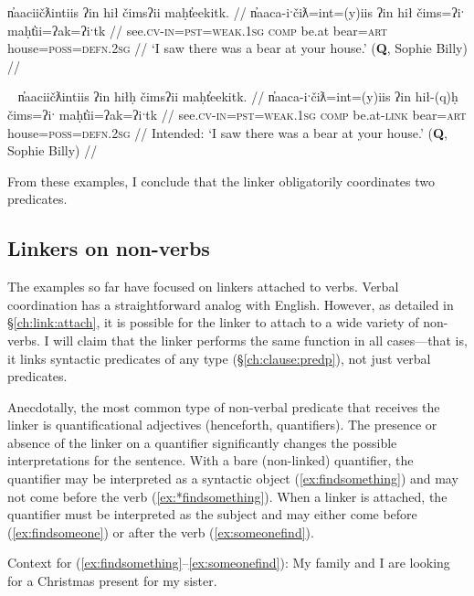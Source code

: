 \ex \label{ex:sawabear}
\begingl
\glpreamble n̓aaciičƛintiis ʔin hił čimsʔii maḥt̓eekitk. //
\gla n̓aaca-iˑčiƛ=int=(y)iis ʔin hił čims=ʔiˑ maḥt̓ii=ʔak=ʔiˑtk //
\glb see.\textsc{cv}-\textsc{in}=\textsc{pst}=\textsc{weak.1sg} \textsc{comp} be.at bear=\textsc{art} house=\textsc{poss}=\textsc{defn.2sg} //
\glft `I saw there was a bear at your house.' (\textbf{Q}, Sophie Billy) //
\endgl
\xe

\ex~ \label{*ex:sawabear}
\begingl
\glpreamble *n̓aaciičƛintiis ʔin hiłḥ čimsʔii maḥt̓eekitk. //
\gla n̓aaca-iˑčiƛ=int=(y)iis ʔin hił-(q)ḥ čims=ʔiˑ maḥt̓ii=ʔak=ʔiˑtk //
\glb see.\textsc{cv}-\textsc{in}=\textsc{pst}=\textsc{weak.1sg} \textsc{comp} be.at-\textsc{link} bear=\textsc{art} house=\textsc{poss}=\textsc{defn.2sg} //
\glft Intended: `I saw there was a bear at your house.' (\textbf{Q}, Sophie Billy) //
\endgl
\xe

From these examples, I conclude that the linker obligatorily coordinates two predicates.

\subsection{Linkers on non-verbs} \label{ch:link:nonverb}

The examples so far have focused on linkers attached to verbs. Verbal coordination has a straightforward analog with English. However, as detailed in \S\ref{ch:link:attach}, it is possible for the linker to attach to a wide variety of non-verbs. I will claim that the linker performs the same function in all cases---that is, it links syntactic predicates of any type (\S\ref{ch:clause:predp}), not just verbal predicates.

Anecdotally, the most common type of non-verbal predicate that receives the linker is quantificational adjectives (henceforth, quantifiers). The presence or absence of the linker on a quantifier significantly changes the possible interpretations for the sentence. With a bare (non-linked) quantifier, the quantifier may be interpreted as a syntactic object (\ref{ex:findsomething}) and may not come before the verb (\ref{ex:*findsomething}). When a linker is attached, the quantifier must be interpreted as the subject and may either come before (\ref{ex:findsomeone}) or after the verb (\ref{ex:someonefind}).

\vspace{5pt}

\noindent Context for (\ref{ex:findsomething}--\ref{ex:someonefind}): My family and I are looking for a Christmas present for my sister.

